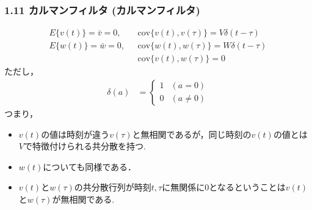 \begin{frame}[t]
\frametitle{1.11 カルマンフィルタ (カルマンフィルタ)}
\vspace*{-5mm}

\addtocounter{equation}{-3}
\begin{align}
     E \{ v(t) \} = \bar{v} = 0, & \ \ \ \mbox{cov}\{ v(t), v(\tau)\} = V \delta(t-\tau)
\\
     E \{ w(t) \} = \bar{w} = 0, & \ \ \ \mbox{cov}\{ w(t), w(\tau)\} = W \delta(t-\tau)
\\
                       & \ \ \ \mbox{cov} \{v(t), w(\tau) \} =0
\end{align}
ただし，
\begin{align}
	\delta(a)
	&= \left \{
		\begin{array}{ll}
			1 & (a =    0) \\
			0 & (a \neq 0)
		\end{array}
	   \right .
\end{align}
つまり，
\begin{itemize}
  \item $v(t)$の値は時刻が違う$v(\tau)$と無相関であるが，同じ時刻の$v(t)$の値とは$V$で特徴付けられる共分散を持つ.
  \item $w(t)$についても同様である．
  \item $v(t)$と$w(\tau)$の共分散行列が時刻$t,\tau$に無関係に$0$となるということは$v(t)$と$w(\tau)$が無相関である.
\end{itemize}
\end{frame}


